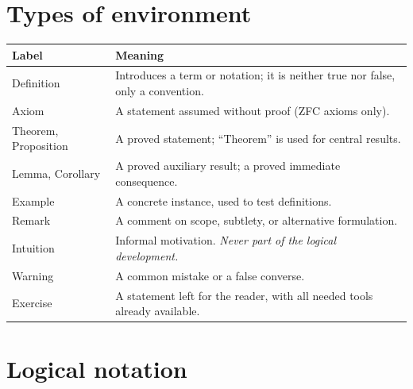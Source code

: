 \section*{Types of environment}

\begin{center}
	\begin{tabular}{@{}lp{10.6cm}@{}}
		\toprule
		\textbf{Label} & \textbf{Meaning}\\
		\midrule
		Definition & Introduces a term or notation; it is neither true nor false, only a convention.\\
		Axiom & A statement assumed without proof (ZFC axioms only).\\
		Theorem, Proposition & A proved statement; ``Theorem'' is used for central results.\\
		Lemma, Corollary & A proved auxiliary result; a proved immediate consequence.\\
		Example & A concrete instance, used to test definitions.\\
		Remark & A comment on scope, subtlety, or alternative formulation.\\
		Intuition & Informal motivation. \emph{Never part of the logical development.}\\
		Warning & A common mistake or a false converse.\\
		Exercise & A statement left for the reader, with all needed tools already available.\\
		\bottomrule
	\end{tabular}
\end{center}

\section*{Logical notation}

